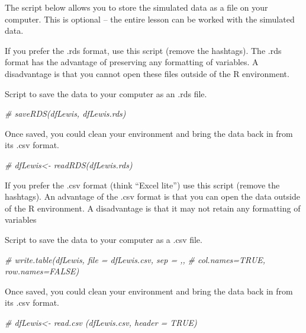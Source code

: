 \documentclass[
  11pt,
]{book}
\newenvironment{Shaded}{\begin{snugshade}}{\end{snugshade}}
\newcommand{\CommentTok}[1]{\textcolor[rgb]{0.37,0.37,0.37}{\textit{#1}}}
\begin{document}
The script below allows you to store the simulated data as a file on your computer. This is optional -- the entire lesson can be worked with the simulated data.

If you prefer the .rds format, use this script (remove the hashtags). The .rds format has the advantage of preserving any formatting of variables. A disadvantage is that you cannot open these files outside of the R environment.

Script to save the data to your computer as an .rds file.

\begin{Shaded}
\begin{Highlighting}[]
\CommentTok{\# saveRDS(dfLewis, \textquotesingle{}dfLewis.rds\textquotesingle{})}
\end{Highlighting}
\end{Shaded}

Once saved, you could clean your environment and bring the data back in from its .csv format.

\begin{Shaded}
\begin{Highlighting}[]
\CommentTok{\# dfLewis\textless{}{-} readRDS(\textquotesingle{}dfLewis.rds\textquotesingle{})}
\end{Highlighting}
\end{Shaded}

If you prefer the .csv format (think ``Excel lite'') use this script (remove the hashtags). An advantage of the .csv format is that you can open the data outside of the R environment. A disadvantage is that it may not retain any formatting of variables

Script to save the data to your computer as a .csv file.

\begin{Shaded}
\begin{Highlighting}[]
\CommentTok{\# write.table(dfLewis, file = \textquotesingle{}dfLewis.csv\textquotesingle{}, sep = \textquotesingle{},\textquotesingle{},}
\CommentTok{\# col.names=TRUE, row.names=FALSE)}
\end{Highlighting}
\end{Shaded}

Once saved, you could clean your environment and bring the data back in from its .csv format.

\begin{Shaded}
\begin{Highlighting}[]
\CommentTok{\# dfLewis\textless{}{-} read.csv (\textquotesingle{}dfLewis.csv\textquotesingle{}, header = TRUE)}
\end{Highlighting}
\end{Shaded}
\end{document}
